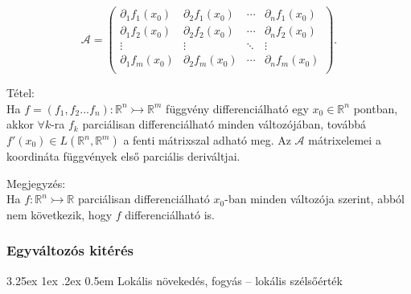 \documentclass[12pt,a4paper]{scrartcl}
\makeatletter
\renewcommand\paragraph{\@startsection{paragraph}{4}{\z@}%
                                    {3.25ex \@plus1ex \@minus.2ex}%
                                    {0.5em} %
                                    {\normalfont\normalsize\bfseries}}
\newenvironment{tetel}{}{}
\newenvironment{megjegyzes}{}{}
\makeatother
\begin{document}
\[\mathcal{A} = {\left( \begin{array}{llll}
{\partial_{1}f_{1}\left( x_{0} \right)} & {\partial_{2}f_{1}\left( x_{0} \right)} & \cdots & {\partial_{n}f_{1}\left( x_{0} \right)} \\
{\partial_{1}f_{2}\left( x_{0} \right)} & {\partial_{2}f_{2}\left( x_{0} \right)} & \cdots & {\partial_{n}f_{2}\left( x_{0} \right)} \\
 \vdots & \vdots & \ddots & \vdots \\
{\partial_{1}f_{m}\left( x_{0} \right)} & {\partial_{2}f_{m}\left( x_{0} \right)} & \cdots & {\partial_{n}f_{m}\left( x_{0} \right)} \\
\end{array} \right).}\]

\begin{tetel}

Tétel:\\
Ha
\(\left. f = \left( {f_{1},f_{2}...f_{n}} \right):{\mathbb{R}}^{n}\rightarrowtail{\mathbb{R}}^{m} \right.\)
függvény differenciálható egy \(x_{0} \in {\mathbb{R}}^{n}\) pontban,
akkor \(\forall k\)-ra \(f_{k}\) parciálisan differenciálható minden
változójában, továbbá
\(f'\left( x_{0} \right) \in L\left( {{\mathbb{R}}^{n},{\mathbb{R}}^{m}} \right)\)
a fenti mátrixszal adható meg. Az \(\mathcal{A}\) mátrixelemei a
koordináta függvények első parciális deriváltjai.

\end{tetel}

\begin{megjegyzes}

Megjegyzés:\\
Ha \(\left. f:{\mathbb{R}}^{n}\rightarrowtail{\mathbb{R}} \right.\)
parciálisan differenciálható \(x_{0}\)-ban minden változója szerint,
abból nem következik, hogy \(f\) differenciálható is.

\end{megjegyzes}

\hypertarget{egyvaltozos-kiteres}{%
\subsubsection{Egyváltozós kitérés}\label{egyvaltozos-kiteres}}

\hypertarget{lokalis-novekedes-fogyas-lokalis-szelsoertek}{%
\paragraph{Lokális növekedés, fogyás -- lokális
szélsőérték}\label{lokalis-novekedes-fogyas-lokalis-szelsoertek}}
\end{document}
